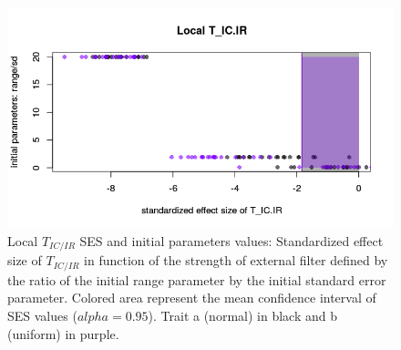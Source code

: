 \documentclass[12pt]{article}\usepackage[]{graphicx}\usepackage[]{color}
\makeatletter
\def\maxwidth{ %
  \ifdim\Gin@nat@width>\linewidth
    \linewidth
  \else
    \Gin@nat@width
  \fi
}
\newenvironment{knitrout}{}{} %
\makeatother
\begin{document}
\begin{knitrout}
\begin{figure}
{\centering \includegraphics[width=\maxwidth]{figure/Ex_filter_results_plot_initparam1-1} 

}

\caption[Local $T_{IC/IR}$ SES and initial parameters values]{Local $T_{IC/IR}$ SES and initial parameters values: Standardized effect size of $T_{IC/IR}$ in function of the strength of external filter defined by the ratio of the initial range parameter by the initial standard error parameter. Colored area represent the mean confidence interval of SES values ($alpha = 0.95$). Trait a (normal) in black and b (uniform) in purple.}\label{fig:Ex_filter_results_plot_initparam1}
\end{figure}


\end{knitrout}
 
\end{document}
